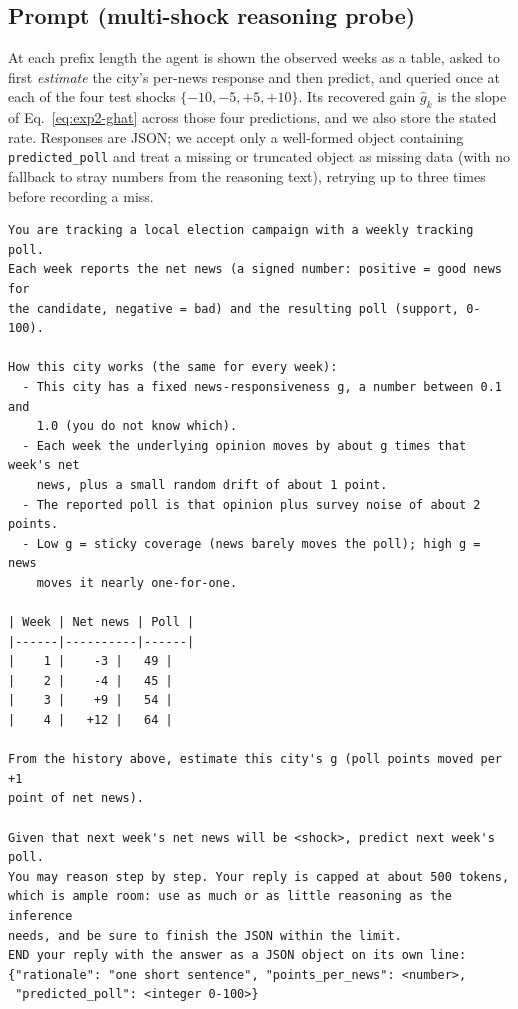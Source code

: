 \subsection{Prompt (multi-shock reasoning probe)}
\label{app:exp2-prompt}

At each prefix length the agent is shown the observed weeks as a table, asked to first
\emph{estimate} the city's per-news response and then predict, and queried once at each of the four
test shocks $\{-10,-5,+5,+10\}$.  Its recovered gain $\hat g_k$ is the slope of
Eq.~\eqref{eq:exp2-ghat} across those four predictions, and we also store the stated rate.
Responses are JSON; we accept only a well-formed object containing \texttt{predicted\_poll} and
treat a missing or truncated object as missing data (with no fallback to stray numbers from the
reasoning text), retrying up to three times before recording a miss.

\begin{small}
\begin{verbatim}
You are tracking a local election campaign with a weekly tracking poll.
Each week reports the net news (a signed number: positive = good news for
the candidate, negative = bad) and the resulting poll (support, 0-100).

How this city works (the same for every week):
  - This city has a fixed news-responsiveness g, a number between 0.1 and
    1.0 (you do not know which).
  - Each week the underlying opinion moves by about g times that week's net
    news, plus a small random drift of about 1 point.
  - The reported poll is that opinion plus survey noise of about 2 points.
  - Low g = sticky coverage (news barely moves the poll); high g = news
    moves it nearly one-for-one.

| Week | Net news | Poll |
|------|----------|------|
|    1 |    -3 |   49 |
|    2 |    -4 |   45 |
|    3 |    +9 |   54 |
|    4 |   +12 |   64 |

From the history above, estimate this city's g (poll points moved per +1
point of net news).

Given that next week's net news will be <shock>, predict next week's poll.
You may reason step by step. Your reply is capped at about 500 tokens,
which is ample room: use as much or as little reasoning as the inference
needs, and be sure to finish the JSON within the limit.
END your reply with the answer as a JSON object on its own line:
{"rationale": "one short sentence", "points_per_news": <number>,
 "predicted_poll": <integer 0-100>}
\end{verbatim}
\end{small}


